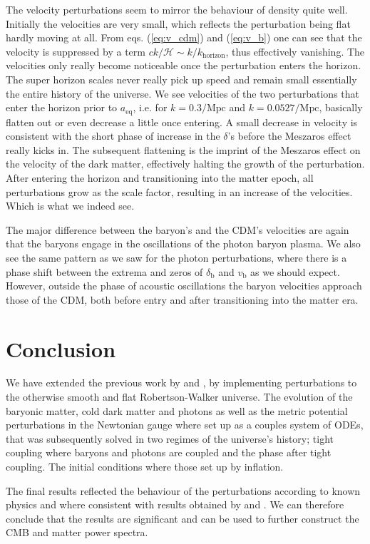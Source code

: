 \documentclass[twocolumn]{aastex62}
\begin{document}
The velocity perturbations seem to mirror the behaviour of density quite well. Initially the velocities are very small, which reflects the perturbation being flat hardly moving at all. From eqs. (\ref{eq:v_cdm}) and (\ref{eq:v_b}) one can see that the velocity is suppressed by a term $ck / \mathcal{H}\sim k / k_\text{horizon}$, thus effectively vanishing. The velocities only really become noticeable once the perturbation enters the horizon. The super horizon scales never really pick up speed and remain small essentially the entire history of the universe. We see velocities of the two perturbations that enter the horizon prior to $a_\text{eq}$, i.e. for $k = 0.3 /\mathrm{Mpc}$ and $k = 0.0527/\mathrm{Mpc}$, basically flatten out or even decrease a little once entering. A small decrease in velocity is consistent with the short phase of increase in the $\delta$'s before the Meszaros effect really kicks in. The subsequent flattening is the imprint of the Meszaros effect on the velocity of the dark matter, effectively halting the growth of the perturbation. After entering the horizon and transitioning into the matter epoch, all perturbations grow as the scale factor, resulting in an increase of the velocities. Which is what we indeed see.

The major difference between the baryon's and the CDM's velocities are again that the baryons engage in the oscillations of the photon baryon plasma. We also see the same pattern as we saw for the photon perturbations, where there is a phase shift between the extrema and zeros of $\delta_\text{b}$ and $v_\text{b}$ as we should expect. However, outside the phase of acoustic oscillations the baryon velocities approach those of the CDM, both before entry and after transitioning into the matter era.

\section{Conclusion} \label{sec:Conclusion}
We have extended the previous work by \cite{stutzer:2020a} and \cite{stutzer:2020b}, by implementing perturbations to the otherwise smooth and flat Robertson-Walker universe. The evolution of the baryonic matter, cold dark matter and photons as well as the metric potential perturbations in the Newtonian gauge where set up as a couples system of ODEs, that was subsequently solved in two regimes of the universe's history; tight coupling where baryons and photons are coupled and the phase after tight coupling. The initial conditions where those set up by inflation. 

The final results reflected the behaviour of the perturbations according to known physics and where consistent with results obtained by \cite{winther:2020b} and \cite{dodelson:2003}. We can therefore conclude that the results are significant and can be used to further construct the CMB and matter power spectra.

\newpage


\end{document}
